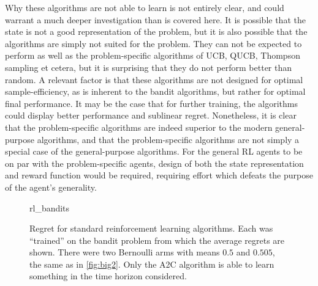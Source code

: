 Why these algorithms are not able to learn is not entirely clear, and could warrant a much deeper investigation than is covered here.
It is possible that the state is not a good representation of the problem, but it is also possible that the algorithms are simply not suited for the problem.
They can not be expected to perform as well as the problem-specific algorithms of UCB, QUCB, Thompson sampling et cetera, but it is surprising that they do not perform better than random.
A relevant factor is that these algorithms are not designed for optimal sample-efficiency, as is inherent to the bandit algorithms, but rather for optimal final performance.
It may be the case that for further training, the algorithms could display better performance and sublinear regret.
Nonetheless, it is clear that the problem-specific algorithms are indeed superior to the modern general-purpose algorithms, and that the problem-specific algorithms are not simply a special case of the general-purpose algorithms.
For the general RL agents to be on par with the problem-specific agents, design of both the state representation and reward function would be required, requiring effort which defeats the purpose of the agent's generality.

\begin{figure}
    \centering
    \newcommand{\myoptions}{
        width=10cm,
        height=8cm,
        xlabel={Kiloturn},
        ylabel={Regret},
        legend entries={A2C, DQN, PPO, QNN},
        legend pos=north west,
        legend cell align=left,
        mystyle,
    }
    {rl_bandits}
    \caption[
        Regret for standard reinforcement learning algorithms.
    ]
    {
        Regret for standard reinforcement learning algorithms.
        Each was \enquote{trained} on the bandit problem from which the average regrets are shown.
        There were two Bernoulli arms with means $0.5$ and $0.505$, the same as in \cref{fig:big2}.
        Only the A2C algorithm is able to learn something in the time horizon considered.
    }
    \label{fig:rl_bandits}
\end{figure}